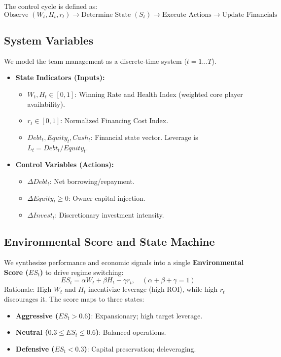 \documentclass{mcmthesis}
\begin{document}
The control cycle is defined as:
\[
\text{Observe } (W_t, H_t, r_t) \to \text{Determine State } (S_t) \to \text{Execute Actions} \to \text{Update Financials}
\]

\subsection{System Variables}
We model the team management as a discrete-time system ($t=1 \dots T$).

\begin{itemize}
    \item \textbf{State Indicators (Inputs):}
    \begin{itemize}
        \item $W_t, H_t \in [0,1]$: Winning Rate and Health Index (weighted core player availability).
        \item $r_t \in [0,1]$: Normalized Financing Cost Index.
        \item $Debt_t, Equity_t, Cash_t$: Financial state vector. Leverage is $L_t = Debt_t / Equity_t$.
    \end{itemize}
    \item \textbf{Control Variables (Actions):}
    \begin{itemize}
        \item $\Delta Debt_t$: Net borrowing/repayment.
        \item $\Delta Equity_t \ge 0$: Owner capital injection.
        \item $\Delta Invest_t$: Discretionary investment intensity.
    \end{itemize}
\end{itemize}

\subsection{Environmental Score and State Machine}
We synthesize performance and economic signals into a single \textbf{Environmental Score ($ES_t$)} to drive regime switching:
\begin{equation}
ES_t = \alpha W_t + \beta H_t - \gamma r_t, \quad (\alpha + \beta + \gamma = 1)
\end{equation}
Rationale: High $W_t$ and $H_t$ incentivize leverage (high ROI), while high $r_t$ discourages it. The score maps to three states:
\begin{itemize}
    \item \textbf{Aggressive ($ES_t > 0.6$)}: Expansionary; high target leverage.
    \item \textbf{Neutral ($0.3 \le ES_t \le 0.6$)}: Balanced operations.
    \item \textbf{Defensive ($ES_t < 0.3$)}: Capital preservation; deleveraging.
\end{itemize}
\end{document}
